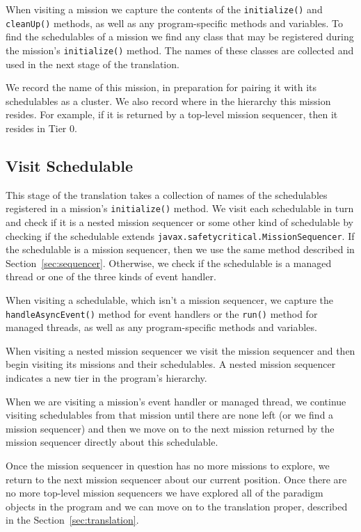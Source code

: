 \documentclass[10pt,a4paper]{article}
\begin{document}
When visiting a mission we capture the contents of the \texttt{initialize()} and \texttt{cleanUp()} methods, as well as any program-specific methods and variables. To find the schedulables of a mission we find any class that may be registered during the mission's \texttt{initialize()} method. The names of these classes are collected and used in the next stage of the translation. 

We record the name of this mission, in preparation for pairing it with its schedulables as a cluster. We also record where in the hierarchy this mission resides. For example, if it is returned by a top-level mission sequencer, then it resides in Tier 0. 

\subsection{Visit Schedulable}
\label{sec:schedulables}

This stage of the translation takes a collection of names of the schedulables registered in a mission's \texttt{initialize()} method. We visit each schedulable in turn and check if it is a nested mission sequencer or some other kind of schedulable by checking if the schedulable extends \texttt{javax.safetycritical.MissionSequencer}. If the schedulable is a mission sequencer, then we use the same method described in Section~\ref{sec:sequencer}. Otherwise, we check if the schedulable is a managed thread or one of the three kinds of event handler.

When visiting a schedulable, which isn't a mission sequencer, we capture the \texttt{handleAsyncEvent()} method for event handlers or the \texttt{run()} method for managed threads, as well as any program-specific methods and variables. 

When visiting a nested mission sequencer we visit the mission sequencer and then begin visiting its missions and their schedulables. A nested mission sequencer indicates a new tier in the program's hierarchy. 

When we are visiting a mission's event handler or managed thread, we continue visiting schedulables from that mission until there are none left (or we find a mission sequencer) and then we move on to the next mission returned by the mission sequencer directly about this schedulable.

Once the mission sequencer in question has no more missions to explore, we return to the next mission sequencer about our current position. Once there are no more top-level mission sequencers we have explored all of the paradigm objects in the program and we can move on to the translation proper, described in the Section~\ref{sec:translation}.
\end{document}
